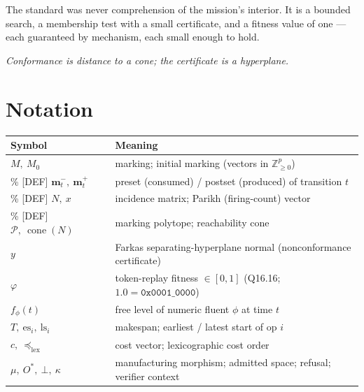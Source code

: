 \documentclass[11pt,oneside]{book}
\theoremstyle{definition}
\theoremstyle{plain}
\theoremstyle{remark}
\newcommand{\muop}{\mu}                        %
\newcommand{\Rfsl}{\bot}                        %
\newcommand{\CL}{\kappa}                       %
\newcommand{\Fitness}{\varphi}
\DeclareMathOperator{\cone}{cone}
\newcommand{\Poly}{\mathcal{P}}                %
\newcommand{\Nmat}{N}                 %
\newcommand{\preset}{\mathbf{m}^{-}}
\newcommand{\postset}{\mathbf{m}^{+}}
\newcommand{\Zplus}{\mathbb{Z}_{\ge 0}}
\newcommand{\CostV}{c}                     %
\newcommand{\code}[1]{\texttt{#1}}
\begin{document}
The standard was never comprehension of the mission's interior. It is a bounded search, a
membership test with a small certificate, and a fitness value of one --- each guaranteed by
mechanism, each small enough to hold.

\begin{center}\itshape Conformance is distance to a cone; the certificate is a hyperplane.\end{center}

\appendix
\chapter{Notation}
\begin{tabular}{ll}
\toprule
Symbol & Meaning\\
\midrule
$M,\ M_0$ & marking; initial marking (vectors in $\Zplus^{p}$)\\\% [DEF]
$\preset_{t},\ \postset_{t}$ & preset (consumed) / postset (produced) of transition $t$\\\% [DEF]
$\Nmat,\ x$ & incidence matrix; Parikh (firing-count) vector\\\% [DEF]
$\Poly,\ \cone(\Nmat)$ & marking polytope; reachability cone\\
$y$ & Farkas separating-hyperplane normal (nonconformance certificate)\\%
$\Fitness$ & token-replay fitness $\in[0,1]$ (Q16.16; $1.0=\code{0x0001\_0000}$)\\
$f_\phi(t)$ & free level of numeric fluent $\phi$ at time $t$\\
$T,\ \text{es}_i,\ \text{ls}_i$ & makespan; earliest / latest start of op $i$\\
$\CostV,\ \preceq_{\mathrm{lex}}$ & cost vector; lexicographic cost order\\
$\muop,\ O^*,\ \Rfsl,\ \CL$ & manufacturing morphism; admitted space; refusal; verifier context\\%
\bottomrule
\end{tabular}
\end{document}
